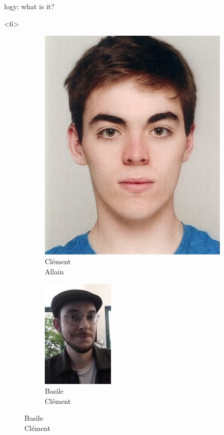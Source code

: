 \begin{frame}[fragile]{\Zoo[]logy: what is it?}
\begin{adjustwidth}{-1em}{-1em}
\begin{overbox}<6>
    \begin{figure}
        \begin{subfigure}{0.24\textwidth}
            \includegraphics[scale=0.55]{images/clement_allain.jpg}
            \caption*{\footnotesize Clément \\ Allain}
        \end{subfigure}
        \begin{subfigure}{0.24\textwidth}
            \includegraphics[scale=0.4]{images/basile_clement.jpg}
            \caption*{\footnotesize Basile \\ Clément}

\end{subfigure}
\end{figure}
\end{overbox}
\end{adjustwidth}
\end{frame}
